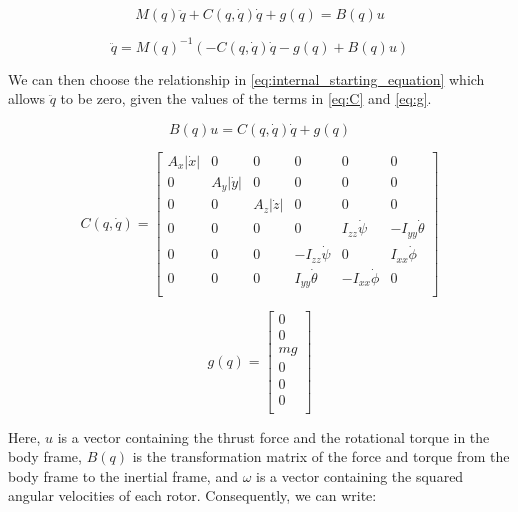 \documentclass[letterpaper,12pt,titlepage,oneside,final]{book}
\begin{document}
\begin{equation} \label{eq:starting_equation}
M(q)\ddot{q} + C(q,\dot{q})\dot{q} + g(q) = B(q)u
\end{equation}

\begin{equation} \label{eq:rearranged_starting_equation}
\ddot{q} = M(q)^{-1}(-C(q,\dot{q})\dot{q} - g(q) + B(q)u)
\end{equation}

We can then choose the relationship in \eqref{eq:internal_starting_equation} which allows $\ddot{q}$ to be zero, given the values of the terms in \eqref{eq:C} and \eqref{eq:g}.

\begin{equation} \label{eq:internal_starting_equation}
B(q)u = C(q,\dot{q})\dot{q} + g(q)
\end{equation}

\begin{equation} \label{eq:C}
C(q,\dot{q}) = 
\begin{bmatrix}
A_{x}|\dot{x}| & 0 & 0 & 0 & 0 & 0 \\
0 & A_{y}|\dot{y}| & 0 & 0 & 0 & 0 \\
0 & 0 & A_{z}|\dot{z}| & 0 & 0 & 0 \\
0 & 0 & 0 & 0 & I_{zz}\dot{\psi} & -I_{yy}\dot{\theta} \\
0 & 0 & 0 & -I_{zz}\dot{\psi} & 0 & I_{xx}\dot{\phi} \\
0 & 0 & 0 & I_{yy}\dot{\theta} & -I_{xx}\dot{\phi} & 0 \\
\end{bmatrix}
\end{equation}

\begin{equation} \label{eq:g}
g(q) =
\begin{bmatrix}
0 \\
0 \\
mg \\
0 \\
0 \\
0 \\
\end{bmatrix}
\end{equation}

Here, $u$ is a vector containing the thrust force and the rotational torque in the body frame, $B(q)$ is the transformation matrix of the force and torque from the body frame to the inertial frame, and $\omega$ is a vector containing the squared angular velocities of each rotor.
Consequently, we can write:
\end{document}
